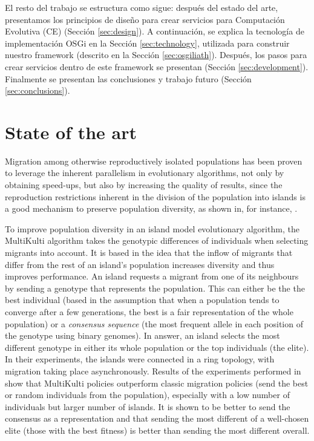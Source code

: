 \documentclass[runningheads]{llncs}
\begin{document}
El resto del trabajo se estructura como sigue: después del estado del arte, presentamos los principios de diseño para crear servicios para Computación Evolutiva (CE) (Sección \ref{sec:design}). A continuación, se explica la tecnología de implementación OSGi en la Sección \ref{sec:technology}, utilizada para construir nuestro framework (descrito en la Sección \ref{sec:osgiliath}). Después, los pasos para crear servicios dentro de este framework se presentan (Sección \ref{sec:development}). Finalmente se presentan las conclusiones y trabajo futuro (Sección \ref{sec:conclusions}).



\section{State of the art}
\label{sec:soa}

Migration among otherwise reproductively isolated populations has been proven to leverage the inherent parallelism in 
evolutionary algorithms, not only by obtaining speed-ups, but also by increasing the quality of results, since the reproduction restrictions inherent in the division of the population into islands is a good mechanism to preserve population diversity, as shown in, for instance, \cite{cantu2001migration}. 

To improve population diversity in an island model evolutionary algorithm, the MultiKulti algorithm \cite{MULTIKULTI11} takes the genotypic
differences of individuals when selecting migrants into account. 
It is based in the idea that the inflow of migrants that differ from the rest of an island's population increases diversity and thus improves performance.
An island requests a migrant from one of its neighbours by sending a genotype that represents the population. This can either be the the best individual (based in the assumption that when a population tends to converge after a few generations, the best is a fair representation of the whole population) or a {\em consensus sequence} (the most frequent allele in each position of the genotype using binary genomes). 
In answer, an island selects the most different genotype in either its whole population or the top individuals (the elite).
In their experiments, the islands were connected in a ring topology, with migration taking place asynchronously.
Results of the experiments performed in \cite{MULTIKULTI11} show that
MultiKulti policies outperform classic migration policies (send the best or
random individuals from the population), especially with a low number of individuals but larger number
of islands. 
It is shown to be better to send the consensus as a representation and that sending the most different of a well-chosen
elite (those with the best fitness) is better than sending the most different overall. 
\end{document}
